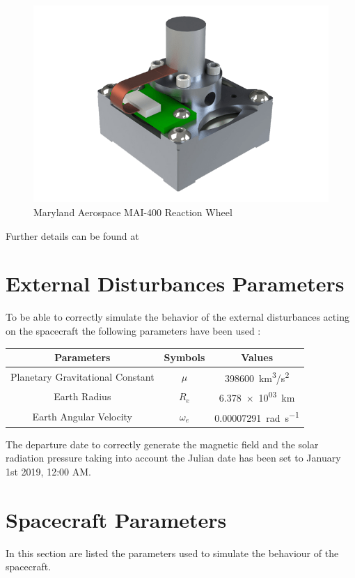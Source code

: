 \documentclass[11pt,a4paper]{report}
\begin{document}
\begin{figure}[H]
 	\centering
 	\includegraphics[scale=0.25]{gfx/mai_reaction_wheel.png}
    \caption{Maryland Aerospace MAI-400 Reaction Wheel}
\end{figure}

Further details can be found at \cite{Ref:DataSheets:ReactionWheel}

\section{External Disturbances Parameters}
To be able to correctly simulate the behavior of the external disturbances acting on the spacecraft the following parameters have been used : 

\begin{table}[H]
	\centering
	\begin{tabular}{|c|c|c|}
		\hline
		Parameters & Symbols & Values \\
		\hline	
		Planetary Gravitational Constant  & $\mu$ &  \SI{398600}{\kilo\meter^3/\second^2}\\
		\hline			
		Earth Radius & $R_e$ & \SI{6.378e+03}{\kilo\meter}\\
		\hline
		Earth Angular Velocity & $\omega_{e}$ & \SI{0.00007291}{\radian\per\second} \\
		\hline
	\end{tabular}
\end{table}

The departure date to correctly generate the magnetic field and the solar radiation pressure taking into account the Julian date has been set to January 1st 2019, 12:00 AM.

\section{Spacecraft Parameters}
In this section are listed the parameters used to simulate the behaviour of the spacecraft.
\end{document}
